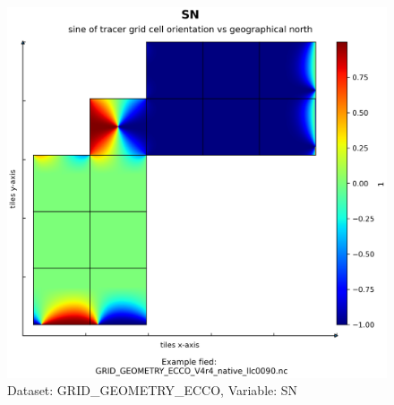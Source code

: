 \begin{figure}[H]
\centering
\includegraphics[scale=0.55]{../images/plots/native_plots_coords/Geometry_Parameters_for_the_Lat-Lon-Cap_90_(llc90)_Native_Model_Grid_(Version_4_Release_4)/SN.png}
\caption{Dataset: GRID\_GEOMETRY\_ECCO, Variable: SN}
\label{tab:table-GRID_GEOMETRY_ECCO_SN-Plot}
\end{figure}
\pagebreak
